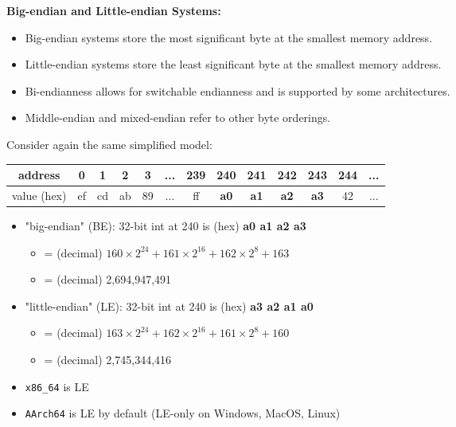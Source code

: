 \documentclass[12pt]{article}
\begin{document}
\textbf{Big-endian and Little-endian Systems:}
\begin{itemize}
    \item Big-endian systems store the most significant byte at the smallest memory address.
    \item Little-endian systems store the least significant byte at the smallest memory address.
    \item Bi-endianness allows for switchable endianness and is supported by some architectures.
    \item Middle-endian and mixed-endian refer to other byte orderings.
\end{itemize}

Consider again the same simplified model:

\begin{tabular}{c c c c c c c c c c c c c}
\hline
address & 0 & 1 & 2 & 3 & ... & \textbf{239} & \textbf{240} & \textbf{241} & \textbf{242} & \textbf{243} & 244 & ... \\
\hline
value (hex) & ef & cd & ab & 89 & ... & ff & \textbf{a0} & \textbf{a1} & \textbf{a2} & \textbf{a3} & 42 & ... \\
\hline
\end{tabular}


\begin{itemize}
    \item "big-endian" (BE): 32-bit int at 240 is (hex) \textbf{a0 a1 a2 a3}
    \begin{itemize}
        \item[] = (decimal) $160 \times 2^{24} + 161 \times 2^{16} + 162 \times 2^{8} + 163$
        \item[] = (decimal) 2,694,947,491
    \end{itemize}
    \item "little-endian" (LE): 32-bit int at 240 is (hex) \textbf{a3 a2 a1 a0}
    \begin{itemize}
        \item[] = (decimal) $163 \times 2^{24} + 162 \times 2^{16} + 161 \times 2^{8} + 160$
        \item[] = (decimal) 2,745,344,416
    \end{itemize}
\end{itemize}

\begin{itemize}
    \item \texttt{x86\_64} is LE
    \item \texttt{AArch64} is LE by default (LE-only on Windows, MacOS, Linux)
\end{itemize}
\end{document}
